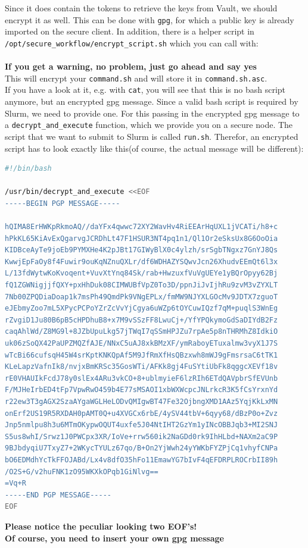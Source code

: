 \documentclass[paper=a4]{scrartcl}
\begin{document}
Since it does contain the tokens to retrieve the keys from Vault, we should encrypt it as well. 
This can be done with \texttt{gpg}, for which a public key is already imported on the secure client. 
In addition, there is a helper script in \texttt{/opt/secure\_workflow/encrypt\_script.sh} which you can call with: \\
 \\
\textbf{If you get a warning, no problem, just go ahead and say yes} \\
This will encrypt your \texttt{command.sh} and will store it in \texttt{command.sh.asc}. 
\\
If you have a look at it, e.g. with \texttt{cat}, you will see that this is no bash script anymore, but an encrypted gpg message.
Since a valid bash script is required by Slurm, we need to provide one. 
For this passing in the encrypted gpg message to a \texttt{decrypt\_and\_execute} function, which we provide you on a secure node. 
The script that we want to submit to Slurm is called \texttt{run.sh}. 
Therefor, an encrypted script has to look exactly like this(of course, the actual message will be different): \\
\begin{lstlisting}[language=bash, caption=run.sh] 
#!/bin/bash

/usr/bin/decrypt_and_execute <<EOF
-----BEGIN PGP MESSAGE-----

hQIMA8ErHWKpRkmoAQ//daYFx4qwwc72XY2WavHv4RiEEArHqUXL1jVCATi/h8+c
hPkKL65KiAvExQgarvgJCRDhLt47F1HSUR3NT4pq1n1/Ql1Or2eSksUx8G6OoOia
KIDBceAyTe9joEb9PYMXHe4K2pJBt17GIWyBlX0c4ylzh/srSgbTNgxz7GnYJ8Qs
KwwjEpFaOy8f4Fuwir9ouKqNZnuQXLr/df6WDHAZYSQwvJcn26XhudvEEmQt6l3x
L/13fdWytwKoKvoqent+VuvXtYnq84Sk/rab+HwzuxfVuVgUEYe1yBQrOpyy62Bj
fQ1ZGWNigjjfQXY+pxHhDuk08CIMWUBfVpZ0To3D/ppnJiJvIjhRu9zvM3vZYXLT
7Nb00ZPQDiaDoap1k7msPh49QmdPk9VNgEPLx/fmMW9NJYXLGOcMv9JDTX7zguoT
eJEbmyZoo7mL5XPycPCPoYZrZcVvYjCgya6uWZp6tOYCuwIQzf7qM+puqlS3WnEg
rZvgiD1Ju80B6pB5cHPDhuB8+x7M9vSSzFF8LwuCj+/YfYPQkymoGdSaDIYdB2Fz
caqAhlWd/Z8MG9l+8JZbUpuLkg57jTWqI7qSSmHPJZu7rpAe5p8nTHRMhZ8IdkiO
uk06zSoQX42PaUPZMQZfAJE/NNxC5uAJ8xkBMzXF/ymRaboyETuxalmw3vyX1J7S
wTcBi66cufsqH45W4srKptKNKQpAf5M9JfRmXfHsQBzxwh8mWJ9gFmsrsaC6tTK1
KLeLapzVafnIk8/nvjxBmKRSc35GosWTi/AFKk8gj4FuSYtiUbFk8qggcXEVf18v
rE0VHAUIkFcdJ78y0slEx4ARu3vkCO+8+ublmyieF6lzRIh6ETdQAVpbrSfEVUnb
F/MJHeIrbED4tFp7VpwRwO459b4E77sMSAOI1xbWXWcpcJNLrkcR3K5fCsYrxnYd
r22ew3T3gAGX2SzaAYgaWGLHeLODvQMIgwBT47Fe32OjbngXMD1AAz5YqjKkLxMN
onErf2US19R5RXDAH0pAMT0Q+u4XVGCx6rbE/4ySV44tbV+6qyy68/dBzP0o+Zvz
Jnp5nmlpu8h3u6MTmOKypwOQUT4uxfe5J04NtIHT2GzYm1yINcOBBJqb3+MI2SNJ
S5us8whI/Srwz1J0PWCpx3XR/IoVe+rrw560ik2NaGDd0rk9IhHLbd+NAXm2aC9P
9BJbdyqiU7TxyZ7+2WKycTYULz67qo/B+On2YjWwh24yYWKbFYZPjCq1vhyfCNPa
bO6EDMdhYcTkFFOJABd/Lx4v8dfO35hFo11EmawYG7bIvF4qEFDRPLROCrbII89h
/O2S+G/v2huFNK1zO95WKXkOPqb1GiNlvg==
=Vq+R
-----END PGP MESSAGE-----
EOF
\end{lstlisting}
\textbf{Please notice the peculiar looking two EOF's!} \\
\textbf{Of course, you need to insert your own gpg message}
\end{document}
